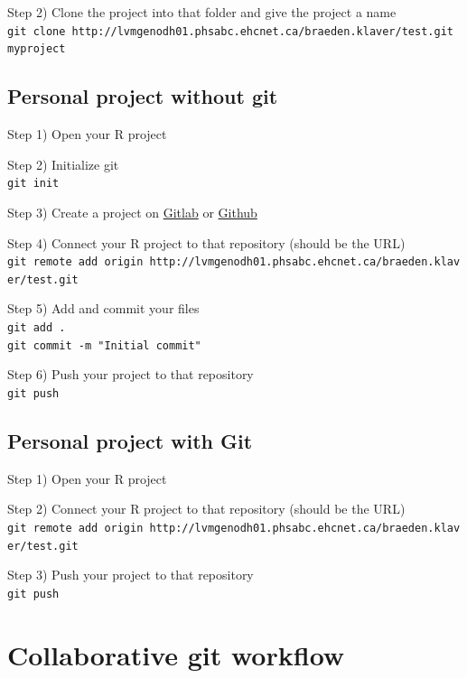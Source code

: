 \documentclass[
]{book}
\begin{document}
Step 2) Clone the project into that folder and give the project a name\\
\texttt{git\ clone\ http://lvmgenodh01.phsabc.ehcnet.ca/braeden.klaver/test.git\ myproject}

\hypertarget{personal-project-without-git}{%
\subsection{Personal project without git}\label{personal-project-without-git}}

Step 1) Open your R project

Step 2) Initialize git\\
\texttt{git\ init}

Step 3) Create a project on \href{https://about.gitlab.com/}{Gitlab} or \href{https://github.com/}{Github}

Step 4) Connect your R project to that repository (should be the URL)\\
\texttt{git\ remote\ add\ origin\ http://lvmgenodh01.phsabc.ehcnet.ca/braeden.klaver/test.git}

Step 5) Add and commit your files\\
\texttt{git\ add\ .}~\\
\texttt{git\ commit\ -m\ "Initial\ commit"}

Step 6) Push your project to that repository\\
\texttt{git\ push}

\hypertarget{personal-project-with-git}{%
\subsection{Personal project with Git}\label{personal-project-with-git}}

Step 1) Open your R project

Step 2) Connect your R project to that repository (should be the URL)\\
\texttt{git\ remote\ add\ origin\ http://lvmgenodh01.phsabc.ehcnet.ca/braeden.klaver/test.git}

Step 3) Push your project to that repository\\
\texttt{git\ push}

\hypertarget{collaborative-git-workflow}{%
\section{Collaborative git workflow}\label{collaborative-git-workflow}}
\end{document}
